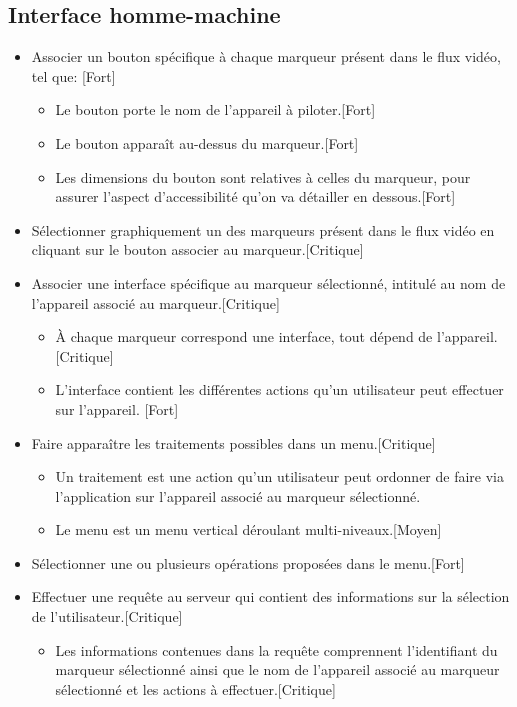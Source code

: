 \documentclass[12pt,a4paper]{article}
\begin{document}
\subsection{Interface homme-machine}
\begin{itemize}
\item Associer un bouton spécifique à chaque marqueur présent dans le flux vidéo, tel que: [Fort]
  \begin{itemize}
  \item Le bouton porte le nom de l'appareil à piloter.[Fort]
  \item Le bouton apparaît au-dessus du marqueur.[Fort]
  \item Les dimensions du bouton sont relatives à celles du marqueur, pour assurer l'aspect d'accessibilité qu'on va détailler en dessous.[Fort]
  \end{itemize}
\item Sélectionner graphiquement un des marqueurs présent dans le flux vidéo en cliquant sur le bouton associer au marqueur.[Critique]
\item Associer une interface spécifique au marqueur sélectionné, intitulé au nom de l'appareil associé au marqueur.[Critique]
  \begin{itemize}
  \item À chaque marqueur correspond une interface, tout dépend de l'appareil.[Critique]
  \item L'interface contient les différentes actions qu'un utilisateur peut effectuer sur l'appareil. [Fort]
  \end{itemize}
\item Faire apparaître les traitements possibles dans un menu.[Critique]
  \begin{itemize}
  \item Un traitement est une action qu'un utilisateur peut ordonner de faire via l'application sur l'appareil associé au marqueur sélectionné.
  \item Le menu est un menu vertical déroulant multi-niveaux.[Moyen]
  \end{itemize}
\item Sélectionner une ou plusieurs opérations proposées dans le menu.[Fort]
\item Effectuer une requête au serveur qui contient des informations sur la sélection de l'utilisateur.[Critique]
  \begin{itemize}
  \item Les informations contenues dans la requête comprennent l'identifiant du marqueur sélectionné ainsi que le nom de l'appareil associé au marqueur sélectionné et les actions à effectuer.[Critique]

\end{itemize}
\end{itemize}
\end{document}

